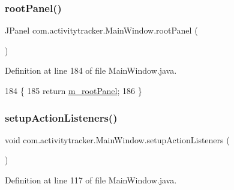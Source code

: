 \subsubsection{\texorpdfstring{root\+Panel()}{rootPanel()}}
{\footnotesize\ttfamily J\+Panel com.\+activitytracker.\+Main\+Window.\+root\+Panel (\begin{DoxyParamCaption}{ }\end{DoxyParamCaption})\hspace{0.3cm}{\ttfamily [package]}}



Definition at line 184 of file Main\+Window.\+java.


\begin{DoxyCode}
184                        \{
185         \textcolor{keywordflow}{return} \mbox{\hyperlink{classcom_1_1activitytracker_1_1_main_window_ac3d61c032aef87f12b1ae6f7dbf482c3}{m\_rootPanel}};
186     \}
\end{DoxyCode}
\mbox{\label{classcom_1_1activitytracker_1_1_main_window_a76b3e8567b228ccd26f09c15ebaddb72}} 
\subsubsection{\texorpdfstring{setup\+Action\+Listeners()}{setupActionListeners()}}
{\footnotesize\ttfamily void com.\+activitytracker.\+Main\+Window.\+setup\+Action\+Listeners (\begin{DoxyParamCaption}{ }\end{DoxyParamCaption})\hspace{0.3cm}{\ttfamily [private]}}



Definition at line 117 of file Main\+Window.\+java.


